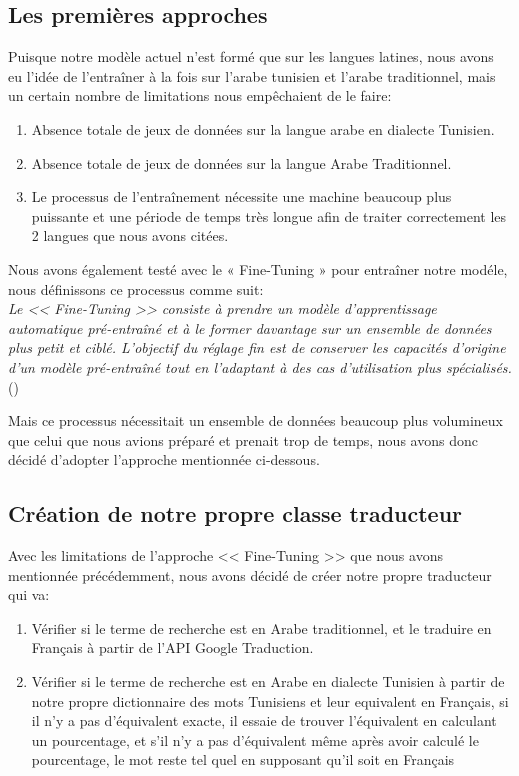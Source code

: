 \newpage
\subsection{Les premières approches}
\noindent
Puisque notre modèle actuel n'est formé que sur les langues latines, nous avons eu l'idée de l'entraîner à la fois sur l'arabe tunisien et l'arabe traditionnel, mais un certain nombre de limitations nous empêchaient de le faire:

\begin{enumerate}
	\item Absence totale de jeux de données sur la langue arabe en dialecte Tunisien.
	\item Absence totale de jeux de données sur la langue Arabe Traditionnel.
	\item Le processus de l'entraînement nécessite une machine beaucoup plus puissante et une période de temps très longue afin de traiter correctement les 2 langues que nous avons citées.
\end{enumerate}

\noindent
Nous avons également testé avec le « Fine-Tuning » pour entraîner notre modéle, nous définissons ce processus comme suit: \\
\textit{Le << Fine-Tuning >> consiste à prendre un modèle d'apprentissage automatique pré-entraîné et à le former davantage sur un ensemble de données plus petit et ciblé. L'objectif du réglage fin est de conserver les capacités d'origine d'un modèle pré-entraîné tout en l'adaptant à des cas d'utilisation plus spécialisés.} \\  (\cite{techtarget:finetuning})

\noindent
Mais ce processus nécessitait un ensemble de données beaucoup plus volumineux que celui que nous avions préparé et prenait trop de temps, nous avons donc décidé d'adopter l'approche mentionnée ci-dessous.

\newpage
\subsection{Création de notre propre classe traducteur}
\noindent
Avec les limitations de l'approche << Fine-Tuning >> que nous avons mentionnée précédemment, nous avons décidé de créer notre propre traducteur qui va:
\begin{enumerate}
	\item Vérifier si le terme de recherche est en Arabe traditionnel, et le traduire en Français à partir de l'API Google Traduction.
	\item Vérifier si le terme de recherche est en Arabe en dialecte Tunisien à partir de notre propre dictionnaire des mots Tunisiens et leur equivalent en Français, si il n'y a pas d'équivalent exacte, il essaie de trouver l'équivalent en calculant un pourcentage, et s'il n'y a pas d'équivalent même après avoir calculé le pourcentage, le mot reste tel quel en supposant qu'il soit en Français
\end{enumerate}

